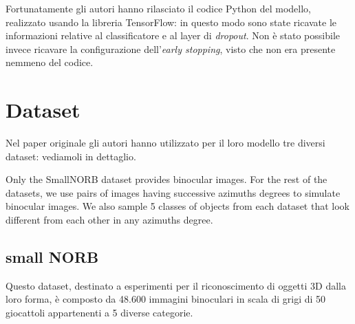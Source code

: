 \documentclass[italian,12pt,a4paper,oneside,final]{report}
\begin{document}
Fortunatamente gli autori hanno rilasciato il codice\cite{cnn2:repository} Python del modello, realizzato usando la libreria TensorFlow: in questo modo sono state ricavate le informazioni relative al classificatore e al layer di \textit{dropout}.
Non è stato possibile invece ricavare la configurazione dell'\textit{early stopping}, visto che non era presente nemmeno del codice.

\section{Dataset}
Nel paper originale gli autori hanno utilizzato per il loro modello tre diversi dataset: vediamoli in dettaglio.

Only the SmallNORB dataset provides binocular images.
For the rest of the datasets, we use pairs of images having successive azimuths degrees to simulate
binocular images. We also sample 5 classes of objects from each dataset that look different from each
other in any azimuths degree. 


\subsection{small NORB}
Questo dataset\cite{dataset:smallnorb}, destinato a esperimenti per il riconoscimento di oggetti 3D dalla loro forma, è composto da 48.600 immagini binoculari in scala di grigi di 50 giocattoli appartenenti a 5 diverse categorie.
\end{document}
